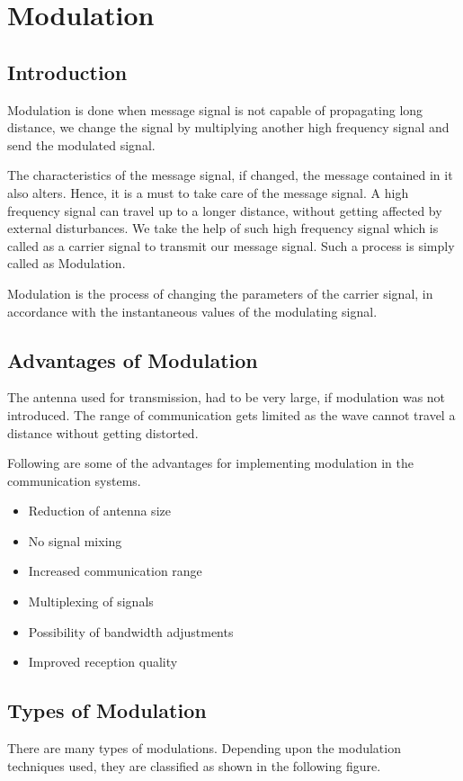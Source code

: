 \chapter{Modulation}

\section{Introduction}
Modulation is done when message signal is not capable of propagating long distance, we change the signal by multiplying another high frequency signal and send the modulated signal.

\par The characteristics of the message signal, if changed, the message contained in it also alters. Hence, it is a must to take care of the message signal. A high frequency signal can travel up to a longer distance, without getting affected by external disturbances. We take the help of such high frequency signal which is called as a carrier signal to transmit our message signal. Such a process is simply called as Modulation.

Modulation is the process of changing the parameters of the carrier signal, in accordance with the instantaneous values of the modulating signal.

\section{Advantages of Modulation}
The antenna used for transmission, had to be very large, if modulation was not introduced. The range of communication gets limited as the wave cannot travel a distance without getting distorted.

Following are some of the advantages for implementing modulation in the communication systems.

\begin{itemize}
  \item Reduction of antenna size
  \item No signal mixing
  \item Increased communication range
  \item Multiplexing of signals
  \item Possibility of bandwidth adjustments
  \item Improved reception quality

\end{itemize}

\section{Types of Modulation}
There are many types of modulations. Depending upon the modulation techniques used, they are classified as shown in the following figure.


